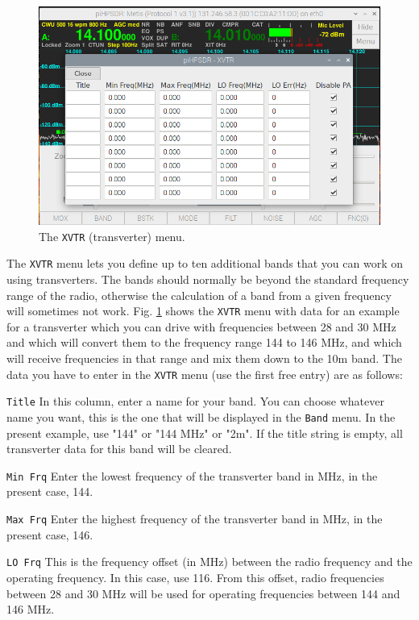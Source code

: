 \documentclass[12pt]{book}
\def\rett#1{\texttt{\color{red}#1}}
\def\bltt#1{\texttt{\color{blue}#1}}
\begin{document}
\begin{figure}[ht]
\center
\includegraphics[width=12cm]{XVTRMenu.png}
\caption{The \bltt{XVTR} (transverter) menu.}
\label{fig:XVTRMenu}
\end{figure}

The \bltt{XVTR} menu lets you define up to ten additional bands
that you can work on using transverters. The bands
should normally be beyond the standard frequency range of
the radio, otherwise the calculation of a band from
a given frequency will sometimes not work.
Fig. \ref{fig:XVTRMenu} shows the \bltt{XVTR} menu with data
for an example for a transverter which you can drive with frequencies
between 28 and 30 MHz and which will convert them to the frequency
range 144 to 146 MHz, and which will receive frequencies in that
range and mix them down to the 10m band. The data you have to enter
in the \bltt{XVTR} menu (use the first free entry) are as follows:

\rett{Title} In this column, enter a name for your band. You can choose
whatever name you want, this is the one that will be displayed in the
\bltt{Band} menu. In the present example, use "144" or "144 MHz" or "2m".
If the title string is empty, all transverter data for this band will
be cleared.

\rett{Min Frq} Enter the lowest frequency of the transverter band in MHz,
in the present case, 144.

\rett{Max Frq} Enter the highest frequency of the transverter band in MHz,
in the present case, 146.

\rett{LO Frq} This is the frequency offset (in MHz) between the radio frequency and
the operating frequency. In this case, use 116. From this offset, radio frequencies
between 28 and 30 MHz will be used for operating frequencies between 144 and 146 MHz.
\end{document}
